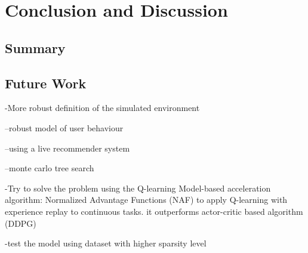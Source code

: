 \chapter{Conclusion and Discussion}
\label{chapterlabel4}

\section{Summary}

\section{Future Work}

-More robust definition of the simulated environment

--robust model of user behaviour

--using a live recommender system

--monte carlo tree search

-Try to solve the problem using the Q-learning Model-based acceleration algorithm: Normalized Advantage Functions (NAF) to apply Q-learning with experience replay to continuous tasks. it outperforms actor-critic based algorithm (DDPG)

-test the model using dataset with higher sparsity level
